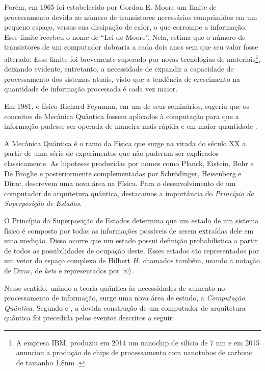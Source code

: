 \documentclass[12pt,oneside,brazil,hidelinks,article,sumario=tradicional,a4paper]{abntex2}
\begin{document}
Porém, em 1965 foi estabelecido por Gordon E. Moore um limite de processamento devido ao número de transistores necessários comprimidos em um pequeno espaço, versus sua dissipação de calor, o que corrompe a informação. Esse limite recebeu o nome de ``Lei de Moore''. Nela, \textcite{moore} estima que o número de transistores de um computador dobraria a cada dois anos sem que seu valor fosse alterado. Esse limite foi brevemente superado por novas tecnologias de materiais\footnote{A empresa IBM, produziu em 2014 um nanochip de silício de 7 nm e em 2015 anunciou a produção de chips de processamento com nanotubos de carbono de tamanho 1,8nm \cite{chipibm}.}, deixando evidente, entretanto, a necessidade de expandir a capacidade de processamento dos sistemas atuais, visto que a tendência de crescimento na quantidade de informação processada é cada vez maior.

Em 1981, o físico Richard Feynman, em um de seus seminários, sugeriu que os conceitos de Mecânica Quântica fossem aplicados à computação para que a informação pudesse ser operada de maneira mais rápida e em maior quantidade \cite{TeoQuanInfoEntreCopia}.

A Mecânica Quântica é o ramo da Física que surge na virada do século XX a partir de uma série de experimentos que não puderam ser explicados classicamente. As hipoteses produzidas por nomes como Planck, Eistein, Bohr e De Broglie e posteriormente complementadas por Schrödinger, Heisenberg e Dirac, descrevem uma nova área na Física. Para o desenvolvimento de um computador de arquitetura quântica, destacamos a importância do \textit{Princípio da Superposição de Estados}.

O Princípio da Superposição de Estados determina que um estado de um sistema físico é composto por todas as informações possíveis de serem extraídas dele em uma medição. Disso ocorre que um estado possui definição probabilística a partir de todos as possibilidades de ocupação deste. Esses estados são representados por um vetor do espaço complexo de Hilbert $H$, chamados também, usando a notação de Dirac, de \textit{kets} e representados por $\ket{\psi}$.

Nesse sentido, unindo a teoria quântica às necessidades de aumento no processamento de informação, surge uma nova área de estudo, a \textit{Computação Quântica}. Segundo \textcite{CompInfoQuantica} e \textcite{dwave}, a devida construção de um computador de arquitetura quântica foi precedida pelos eventos descritos a seguir:
\end{document}
